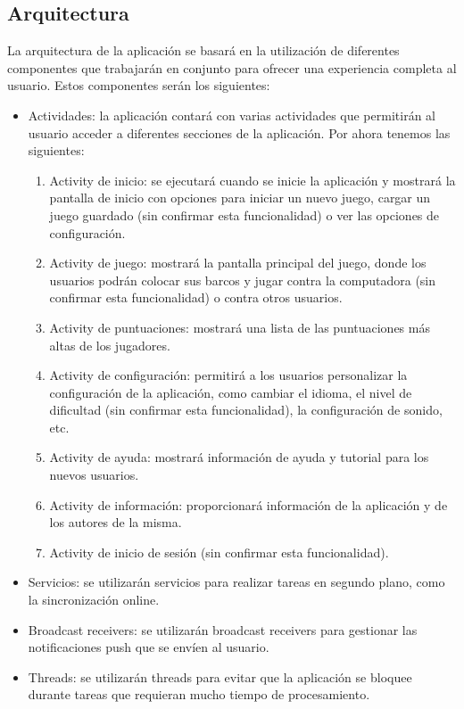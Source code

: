 \documentclass[a4paper, openright, 12pt]{article}
\begin{document}
\subsection{Arquitectura}
La arquitectura de la aplicación se basará en la utilización de diferentes componentes que trabajarán en conjunto para ofrecer una experiencia completa al usuario. Estos componentes serán los siguientes:
\begin{itemize}
    \item Actividades: la aplicación contará con varias actividades que permitirán al usuario acceder a diferentes secciones de la aplicación. Por ahora tenemos las siguientes:
        \begin{enumerate}
            \item Activity de inicio: se ejecutará cuando se inicie la aplicación y mostrará la pantalla de inicio con opciones para iniciar un nuevo juego, cargar un juego guardado (sin confirmar esta funcionalidad) o ver las opciones de configuración.
            \item Activity de juego: mostrará la pantalla principal del juego, donde los usuarios podrán colocar sus barcos y jugar contra la computadora (sin confirmar esta funcionalidad) o contra otros usuarios.
            \item Activity de puntuaciones: mostrará una lista de las puntuaciones más altas de los jugadores.
            \item Activity de configuración: permitirá a los usuarios personalizar la configuración de la aplicación, como cambiar el idioma, el nivel de dificultad (sin confirmar esta funcionalidad), la configuración de sonido, etc.
            \item Activity de ayuda: mostrará información de ayuda y tutorial para los nuevos usuarios.
            \item Activity de información: proporcionará información de la aplicación y de los autores de la misma.
            \item Activity de inicio de sesión (sin confirmar esta funcionalidad).
        \end{enumerate}
    \item Servicios: se utilizarán servicios para realizar tareas en segundo plano, como la sincronización online.
    \item Broadcast receivers: se utilizarán broadcast receivers para gestionar las notificaciones push que se envíen al usuario.
    \item Threads: se utilizarán threads para evitar que la aplicación se bloquee durante tareas que requieran mucho tiempo de procesamiento.
\end{itemize}
\end{document}
